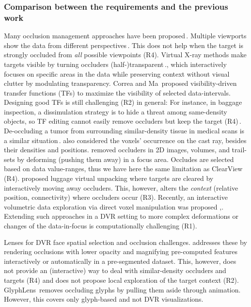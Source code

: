\subsubsection{ Comparison between the requirements and the previous work }

Many occlusion management approaches have been proposed\,\cite{4483791}. Multiple viewports show the data from different perspectives\,\cite{WangBaldonado:2000:GUM:345513.345271}. This does not help when the target is strongly occluded from \emph{all} possible viewpoints (R4). Virtual X-ray methods make targets visible by turning occluders (half-)transparent\,\cite{Burns:2008:ACC:1457515.1409107}.\cite{4015450}, which interactively focuses on specific areas in the data while preserving context without visual clutter by modulating transparency. Correa and Ma\,\cite{5416704} proposed visibility-driven transfer functions (TFs) to maximize the visibility of selected data-intervals. Designing good TFs is still challenging (R2) in general: For instance, in baggage inspection, a dissimulation strategy is to hide a threat among same-density objects, so TF editing cannot easily remove occluders but keep the target (R4)\,\cite{7819413}. De-occluding a tumor from surrounding similar-density tissue in medical scans is a similar situation\,\cite{CGF:CGF12927}. 
\cite{CGF:CGF979} also considered the voxels' occurrence on the cast ray, besides their densities and positions.\cite{6787171} removed occluders in 2D images, volumes, and trail-sets by deforming (pushing them away) in a focus area. Occludes are selected based on data value-ranges, thus we have here the same limitation as ClearView (R4). \cite{Li:2012:LVV:2425296.2425325} proposed luggage virtual unpacking where targets are cleared by interactively moving away occluders. This, however, alters the \emph{context} (relative position, connectivity) where occluders occur (R3). Recently, an interactive volumetric data exploration via direct voxel manipulation was proposed ,\cite{7819413}. Extending such approaches in a DVR setting to more complex deformations or changes of the data-in-focus is computationally challenging (R1).

Lenses for DVR face spatial selection and occlusion challenges. \cite{1532818} addresses these by rendering occlusions with lower opacity and magnifying pre-computed features interactively or automatically in a pre-segmented dataset. This, however, does not provide an (interactive) way to deal with similar-density occluders and targets (R4) and does not propose local exploration of the target context (R2). GlyphLens\,\cite{7539643} removes occluding glyphs by pulling them aside through animation. However, this covers only glyph-based and not DVR visualizations. 

